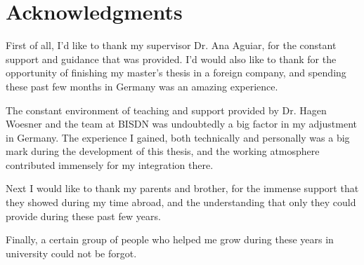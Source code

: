 \chapter*{Acknowledgments}

First of all, I'd like to thank my supervisor Dr. Ana Aguiar, for the constant support and guidance that was provided. I'd would also like to thank for the 
opportunity of finishing my master's thesis in a foreign company, and spending these past few months in Germany was an amazing experience.

\par The constant environment of teaching and support provided by Dr. Hagen Woesner and the team at BISDN was undoubtedly a big factor in my adjustment in Germany.
The experience I gained, both technically and personally was a big mark during the development of this thesis, and the working atmosphere contributed immensely
for my integration there.

\par Next I would like to thank my parents and brother, for the immense support that they showed during my time abroad, and the understanding that only they could
provide during these past few years. 

\par Finally, a certain group of people who helped me grow during these years in university could not be forgot.
